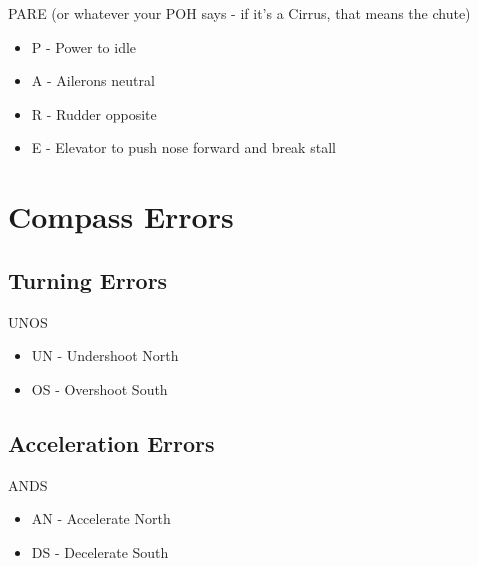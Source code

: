 PARE (or whatever your POH says - if it's a Cirrus, that means the chute)

\begin{itemize}
    \item P - Power to idle
    \item A - Ailerons neutral
    \item R - Rudder opposite
    \item E - Elevator to push nose forward and break stall
\end{itemize}

\section{Compass Errors}

\subsection{Turning Errors}

UNOS

\begin{itemize}
    \item UN - Undershoot North
    \item OS - Overshoot South
\end{itemize}

\subsection{Acceleration Errors}

ANDS

\begin{itemize}
    \item AN - Accelerate North
    \item DS - Decelerate South
\end{itemize}



